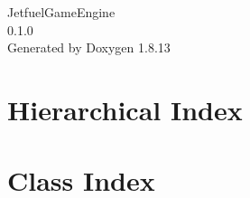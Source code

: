 \documentclass[twoside]{book}
\newcommand{\+}{\discretionary{\mbox{\scriptsize$\hookleftarrow$}}{}{}}
\newcommand{\clearemptydoublepage}{%
  \newpage{\pagestyle{empty}\cleardoublepage}%
}
\begin{document}
\hypersetup{pageanchor=false,
             bookmarksnumbered=true,
             pdfencoding=unicode
            }
\begin{titlepage}
\vspace*{7cm}
\begin{center}%
{\Large Jetfuel\+Game\+Engine \\[1ex]\large 0.\+1.\+0 }\\
\vspace*{1cm}
{\large Generated by Doxygen 1.8.13}\\
\end{center}
\end{titlepage}
\clearemptydoublepage
{}
\tableofcontents
\clearemptydoublepage
{}
\hypersetup{pageanchor=true}

\chapter{Hierarchical Index}

\chapter{Class Index}

\end{document}
